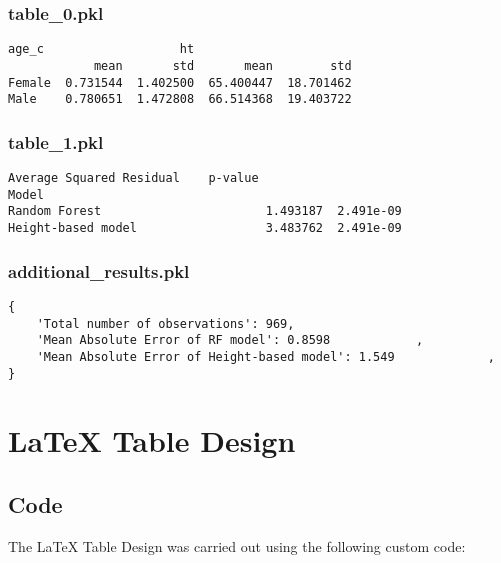 \documentclass[11pt]{article}
\begin{document}
\subsubsection*{table\_0.pkl}

\begin{Verbatim}[tabsize=4]
           age_c                   ht
            mean       std       mean        std
Female  0.731544  1.402500  65.400447  18.701462
Male    0.780651  1.472808  66.514368  19.403722
\end{Verbatim}

\subsubsection*{table\_1.pkl}

\begin{Verbatim}[tabsize=4]
                    Average Squared Residual    p-value
Model
Random Forest                       1.493187  2.491e-09
Height-based model                  3.483762  2.491e-09
\end{Verbatim}

\subsubsection*{additional\_results.pkl}

\begin{Verbatim}[tabsize=4]
{
    'Total number of observations': 969,
    'Mean Absolute Error of RF model': 0.8598            ,
    'Mean Absolute Error of Height-based model': 1.549             ,
}
\end{Verbatim}

\section{LaTeX Table Design}
\subsection{{Code}}
The LaTeX Table Design was carried out using the following custom code:
\end{document}
